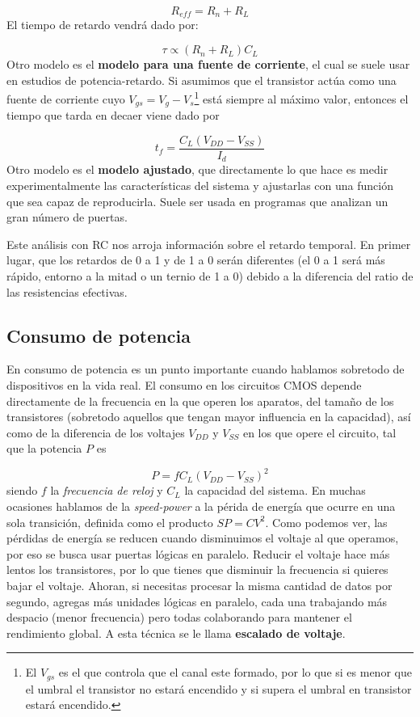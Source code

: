 \begin{equation}
    R_{eff} = R_n + R_L
\end{equation} 
El tiempo de retardo vendrá dado por: 

\begin{equation}
    \tau \propto (R_n + R_L) C_L
\end{equation}
Otro modelo es el \textbf{modelo para una fuente de corriente}, el cual se suele usar en estudios de potencia-retardo. Si asumimos que el transistor actúa como una fuente de corriente cuyo $V_{gs}=V_g-V_s$\footnote{El $V_{gs}$ es el que controla que el canal este formado, por lo que si es menor que el umbral el transistor no estará encendido y si supera el umbral en transistor estará encendido.} está siempre al máximo valor, entonces el tiempo que tarda en decaer viene dado por 

\begin{equation}
    t_f = \frac{C_L (V_{DD}-V_{SS})}{I_d}
\end{equation}
Otro modelo es el \textbf{modelo ajustado}, que directamente lo que hace es medir experimentalmente las características del sistema y ajustarlas con una función que sea capaz de reproducirla. Suele ser usada en programas que analizan un gran número de puertas. 

Este análisis con RC nos arroja información sobre el retardo temporal. En primer lugar, que los retardos de 0 a 1 y de 1 a 0 serán diferentes (el 0 a 1 será más rápido, entorno a la mitad o un ternio de 1 a 0) debido a la diferencia del ratio de las resistencias efectivas. 

\subsection{Consumo de potencia}

En consumo de potencia es un punto importante cuando hablamos sobretodo de dispositivos en la vida real. El consumo en los circuitos CMOS depende directamente de la frecuencia en la que operen los aparatos, del tamaño de los transistores (sobretodo aquellos que tengan mayor influencia en la capacidad), así como de la diferencia de los voltajes $V_{DD}$ y $V_{SS}$ en los que opere el circuito, tal que la potencia $P$ es

\begin{equation}
    P = f C_L (V_{DD}-V_{SS})^2
\end{equation}
siendo $f$ la \textit{frecuencia de reloj} y $C_L$ la capacidad del sistema. En muchas ocasiones hablamos de la \textit{speed-power} a la périda de energía que ocurre en una sola transición, definida como el producto $SP=CV^2$. Como podemos ver, las pérdidas de energía se reducen cuando disminuimos el voltaje al que operamos, por eso se busca usar puertas lógicas en paralelo. Reducir el voltaje hace más lentos los transistores, por lo que tienes que disminuir la frecuencia si quieres bajar el voltaje. Ahoran, si necesitas procesar la misma cantidad de datos por segundo, agregas más unidades lógicas en paralelo, cada una trabajando más despacio (menor frecuencia) pero todas colaborando para mantener el rendimiento global. A esta técnica se le llama \textbf{escalado de voltaje}.


